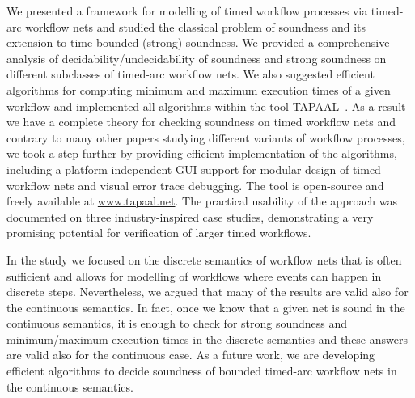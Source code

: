 We presented a framework for modelling of timed workflow processes
via timed-arc workflow nets and studied the classical problem of
soundness and its extension to time-bounded (strong) soundness.
We provided a comprehensive analysis of decidability/undecidability
of soundness and strong soundness on different subclasses of timed-arc
workflow nets. We also suggested efficient algorithms for computing
minimum and maximum execution times of a given workflow and implemented
all algorithms within the tool TAPAAL~\cite{DJJJMS:TACAS:12}. 
As a result we have a complete theory for checking soundness on
timed workflow nets and contrary to many other papers studying
different variants of workflow processes, we took a step further
by providing efficient implementation of the algorithms, including
a platform independent GUI support for modular design of timed
workflow nets and visual error trace debugging. The tool is open-source
and freely available at \url{www.tapaal.net}.
The practical usability of 
the approach was documented on three industry-inspired case studies,
demonstrating a very promising potential for verification of larger
timed workflows.

In the study we focused on the discrete semantics 
of workflow nets that is often sufficient and allows for modelling
of workflows where events can happen in discrete steps.
Nevertheless, we argued that many of the results
are valid also for the continuous semantics. In fact, once we
know that a given net is sound in the continuous semantics,
it is enough to check for strong soundness and minimum/maximum
execution times in the discrete semantics and these answers
are valid also for the continuous case. As a future work, we 
are developing efficient algorithms to decide soundness 
of bounded timed-arc workflow nets in the continuous semantics.